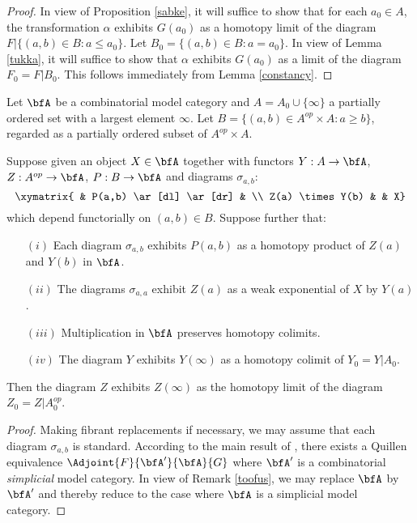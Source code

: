\begin{Simplicial Categories}
\begin{proof}
In view of Proposition \ref{sabke}, it will suffice to show that
for each $a_0 \in A$, the transformation $\alpha$ exhibits
$G(a_0)$ as a homotopy limit of the diagram
$F | \{ (a,b) \in B: a \leq a_0 \}$. 
Let $B_0 = \{ (a,b) \in B: a = a_0 \}$. In view of Lemma \ref{tukka}, it will
suffice to show that $\alpha$ exhibits $G(a_0)$ as a limit of the diagram
$F_0 = F | B_0$. This follows immediately from Lemma \ref{constancy}.
\end{proof}

\begin{proposition}\label{psygood}
Let $\bfA$ be a combinatorial model category and $A = A_0 \cup \{ \infty \}$
a partially ordered set with a largest element $\infty$. Let 
$B = \{ (a,b) \in A^{op} \times A: a \geq b \}$, regarded as a partially ordered subset
of $A^{op} \times A$. 

Suppose given an object $X \in \bfA$ together with functors
$Y: A \rightarrow \bfA$, $Z: A^{op} \rightarrow \bfA$,
$P: B \rightarrow \bfA$ and diagrams $\sigma_{a,b}$: 
$$ \xymatrix{ & P(a,b) \ar[dl] \ar[dr] & \\
Z(a) \times Y(b) & & X}$$
which depend functorially on $(a,b) \in B$.
Suppose further that:
\begin{itemize}
\item[$(i)$] Each diagram $\sigma_{a,b}$ exhibits $P(a,b)$ as a homotopy product
of $Z(a)$ and $Y(b)$ in $\bfA$.

\item[$(ii)$] The diagrams $\sigma_{a,a}$ exhibit $Z(a)$ as a weak exponential
of $X$ by $Y(a)$.

\item[$(iii)$] Multiplication in $\bfA$ preserves homotopy colimits.

\item[$(iv)$] The diagram $Y$ exhibits $Y(\infty)$ as a homotopy colimit of
$Y_0 = Y|A_0$.
\end{itemize}
Then the diagram $Z$ exhibits $Z(\infty)$ as the homotopy limit of
the diagram $Z_0 = Z | A_0^{op}$. 
\end{proposition}

\begin{proof}
Making fibrant replacements if necessary, we may assume that each diagram
$\sigma_{a,b}$ is standard. 
According to the main result of \cite{combmodel}, there exists a Quillen equivalence
$\Adjoint{F}{\bfA'}{\bfA}{G}$ where $\bfA'$ is a combinatorial {\em simplicial} model category.
In view of Remark \ref{toofus}, we may replace $\bfA$ by $\bfA'$
and thereby reduce to the case where $\bfA$ is a simplicial model category. 


\end{proof}
\end{Simplicial Categories}
